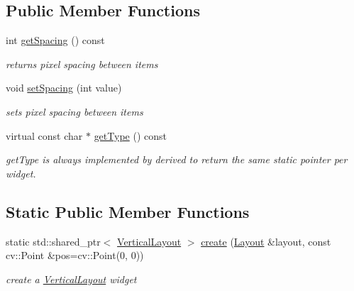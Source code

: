 \subsection*{Public Member Functions}
\begin{DoxyCompactItemize}
\item 
int \hyperlink{classcanvascv_1_1VerticalLayout_a49f7dd2e6eb7f60df3489069b4af500e}{get\+Spacing} () const \hypertarget{classcanvascv_1_1VerticalLayout_a49f7dd2e6eb7f60df3489069b4af500e}{}\label{classcanvascv_1_1VerticalLayout_a49f7dd2e6eb7f60df3489069b4af500e}

\begin{DoxyCompactList}\small\item\em returns pixel spacing between items \end{DoxyCompactList}\item 
void \hyperlink{classcanvascv_1_1VerticalLayout_ae3f58b90e8d957642feb2cc5e3100bd1}{set\+Spacing} (int value)\hypertarget{classcanvascv_1_1VerticalLayout_ae3f58b90e8d957642feb2cc5e3100bd1}{}\label{classcanvascv_1_1VerticalLayout_ae3f58b90e8d957642feb2cc5e3100bd1}

\begin{DoxyCompactList}\small\item\em sets pixel spacing between items \end{DoxyCompactList}\item 
virtual const char $\ast$ \hyperlink{classcanvascv_1_1VerticalLayout_a1b6eaaa782a4c9c880feb49d595d45b6}{get\+Type} () const 
\begin{DoxyCompactList}\small\item\em get\+Type is always implemented by derived to return the same static pointer per widget. \end{DoxyCompactList}\end{DoxyCompactItemize}
\subsection*{Static Public Member Functions}
\begin{DoxyCompactItemize}
\item 
static std\+::shared\+\_\+ptr$<$ \hyperlink{classcanvascv_1_1VerticalLayout}{Vertical\+Layout} $>$ \hyperlink{classcanvascv_1_1VerticalLayout_a3e0ae249db062663815d2d822e178dd3}{create} (\hyperlink{classcanvascv_1_1Layout}{Layout} \&layout, const cv\+::\+Point \&pos=cv\+::\+Point(0, 0))
\begin{DoxyCompactList}\small\item\em create a \hyperlink{classcanvascv_1_1VerticalLayout}{Vertical\+Layout} widget \end{DoxyCompactList}\end{DoxyCompactItemize}
